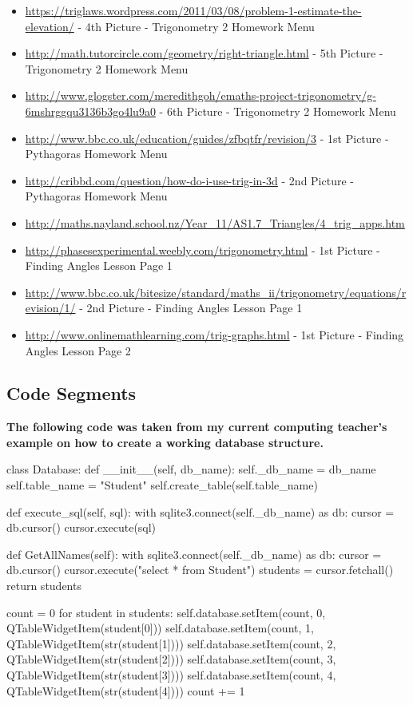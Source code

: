 \begin{itemize}
	\item \url{https://triglaws.wordpress.com/2011/03/08/problem-1-estimate-the-elevation/} - 4th Picture - Trigonometry 2 Homework Menu
	\item \url{http://math.tutorcircle.com/geometry/right-triangle.html} - 5th Picture - Trigonometry 2 Homework Menu
	\item \url{http://www.glogster.com/meredithgoh/emaths-project-trigonometry/g-6mshrggqu3136b3go4lu9a0} - 6th Picture - Trigonometry 2 Homework Menu
	\item \url{http://www.bbc.co.uk/education/guides/zfbqtfr/revision/3} - 1st Picture - Pythagoras Homework Menu
	\item \url{http://cribbd.com/question/how-do-i-use-trig-in-3d} - 2nd Picture - Pythagoras Homework Menu
	\item \url{http://maths.nayland.school.nz/Year_11/AS1.7_Triangles/4_trig_apps.htm}
	\item \url{http://phasesexperimental.weebly.com/trigonometry.html} - 1st Picture - Finding Angles Lesson Page 1
	\item \url{http://www.bbc.co.uk/bitesize/standard/maths_ii/trigonometry/equations/revision/1/} - 2nd Picture - Finding Angles Lesson Page 1
	\item \url{http://www.onlinemathlearning.com/trig-graphs.html} - 1st Picture - Finding Angles Lesson Page 2
\end{itemize}

\subsection{Code Segments}

\textbf{The following code was taken from my current computing teacher's example on how to create a working database structure.}

\begin{python}
class Database:
    def __init__(self, db_name):
        self._db_name = db_name
        self.table_name = "Student"
        self.create_table(self.table_name)
        
    def execute_sql(self, sql):
        with sqlite3.connect(self._db_name) as db:
            cursor = db.cursor()
            cursor.execute(sql)

	def GetAllNames(self):
        with sqlite3.connect(self._db_name) as db:
            cursor = db.cursor()
            cursor.execute("select * from Student")
            students = cursor.fetchall()
            return students

	count = 0
        for student in students:
            self.database.setItem(count, 0, QTableWidgetItem(student[0]))
            self.database.setItem(count, 1, QTableWidgetItem(str(student[1])))
            self.database.setItem(count, 2, QTableWidgetItem(str(student[2])))
            self.database.setItem(count, 3, QTableWidgetItem(str(student[3])))
            self.database.setItem(count, 4, QTableWidgetItem(str(student[4])))
            count += 1
\end{python}


